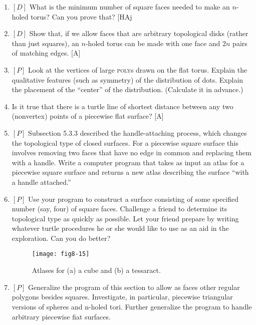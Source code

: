 \documentclass{book}
\begin{document}
\begin{enumerate}
\item $[D]$ What is the minimum number of square faces needed to make an
$n$-holed torus? Can you prove that? [HAj

\item $[D]$ Show that, if we allow faces that are arbitrary topological disks
(rather than just squares), an $n$-holed torus can be made with one face
and $2n$ pairs of matching edges. [A]

\item $[P]$ Look at the vertices of large \textsc{poly}s drawn on the flat torus.
Explain the qualitative features (such as symmetry) of the distribution
of dots. Explain the placement of the ``center'' of the distribution.
(Calculate it in advance.)

\item Is it true that there is a turtle line of shortest distance between any
two (nonvertex) points of a piecewise flat surface? [A]

\item $[P]$ Subsection 5.3.3 described the handle-attaching process, which
changes the topological type of closed surfaces. For a piecewise square
surface this involves removing two faces that have no edge in common
and replacing them with a handle. Write a computer program that takes
as input an atlas for a piecewise square surface and returns a new atlas
describing the surface ``with a handle attached.''

\item $[P]$ Use your program to construct a surface consisting of some specified number (say, four) of square faces. Challenge a friend to determine
its topological type as quickly as possible. Let your friend prepare by
writing whatever turtle procedures he or she would like to use as an aid
in the exploration. Can you do better?

\begin{figure}
\begin{center}
\texttt{[image: fig8-15]}
\caption{Atlases for (a) a cube and (b) a tessaract.}
\end{center}
\end{figure}

\item $[P]$ Generalize the program of this section to allow as faces other
regular polygons besides squares. Investigate, in particular, piecewise
triangular versions of spheres and n-holed tori. Further generalize the
program to handle arbitrary piecewise fiat surfaces.


\end{enumerate}
\end{document}
